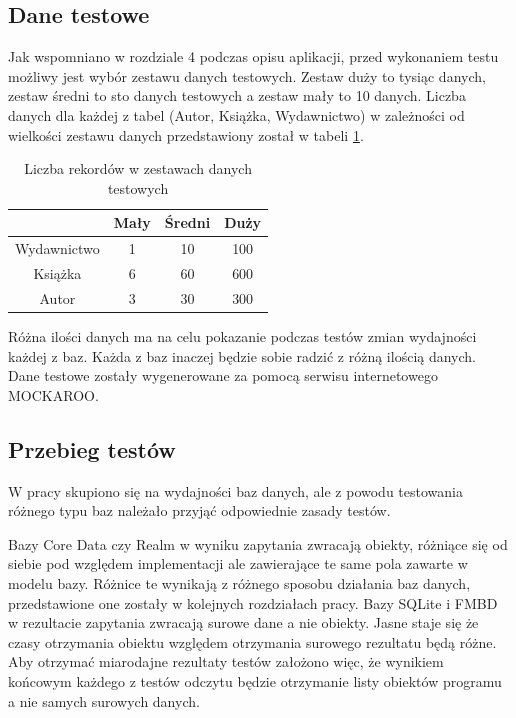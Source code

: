 \subsection{Dane testowe}

Jak wspomniano w rozdziale  4 podczas opisu aplikacji, przed wykonaniem testu możliwy jest wybór zestawu danych testowych. Zestaw duży to tysiąc danych, zestaw średni to sto danych testowych a zestaw mały to 10 danych. Liczba danych dla każdej z tabel (Autor, Książka, Wydawnictwo) w zależności od wielkości zestawu danych przedstawiony został w tabeli \ref{tab: zestaw_danych}.

\begin{table}[h]
\centering
\caption {Liczba rekordów w zestawach danych testowych}
\label{tab: zestaw_danych}
\begin{tabular}{|c|c|c|c|}
\hline
\multicolumn{1}{|l|}{} & Mały & Średni & Duży \\ \hline
Wydawnictwo            & 1    & 10     & 100  \\ \hline
Książka                & 6    & 60     & 600  \\ \hline
Autor                  & 3    & 30     & 300  \\ \hline
\end{tabular}
\end{table}

Różna ilości danych ma na celu pokazanie podczas testów zmian wydajności każdej z baz. Każda z baz inaczej będzie sobie radzić z różną ilością danych. Dane testowe zostały wygenerowane za pomocą serwisu internetowego MOCKAROO. 

\subsection{Przebieg testów}

W pracy skupiono się na wydajności baz danych, ale z powodu testowania różnego typu baz należało przyjąć odpowiednie zasady testów.\par 
Bazy Core Data czy Realm w wyniku zapytania zwracają obiekty, różniące się od siebie pod względem implementacji ale zawierające te same pola zawarte w modelu bazy. Różnice te wynikają z różnego sposobu działania baz danych, przedstawione one zostały w kolejnych rozdziałach pracy. Bazy SQLite i FMBD w rezultacie zapytania zwracają surowe dane a nie obiekty. Jasne staje się że czasy otrzymania obiektu względem otrzymania surowego rezultatu będą różne. Aby otrzymać miarodajne rezultaty testów założono więc, że wynikiem końcowym każdego z testów odczytu będzie otrzymanie listy obiektów programu a nie samych surowych danych. 

